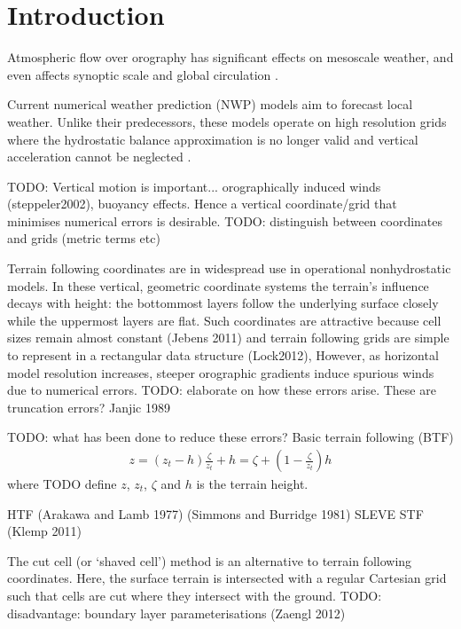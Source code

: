\chapter{Introduction}


Atmospheric flow over orography has significant effects on mesoscale weather, and even affects synoptic scale and global circulation \autocite{good2013}.

Current numerical weather prediction (NWP) models aim to forecast local weather.  Unlike their predecessors, these models operate on high resolution grids where the hydrostatic balance approximation is no longer valid and vertical acceleration cannot be neglected \autocite{steppeler2003}.

TODO: Vertical motion is important... orographically induced winds (steppeler2002), buoyancy effects.  Hence a vertical coordinate/grid that minimises numerical errors is desirable. TODO: distinguish between coordinates and grids (metric terms etc)

Terrain following coordinates are in widespread use in operational nonhydrostatic models.  In these vertical, geometric coordinate systems the terrain's influence decays with height: the bottommost layers follow the underlying surface closely while the uppermost layers are flat.  Such coordinates are attractive because cell sizes remain almost constant (Jebens 2011) and terrain following grids are simple to represent in a rectangular data structure (Lock2012),  However, as horizontal model resolution increases, steeper orographic gradients induce spurious winds due to numerical errors. \autocite{TODO}  TODO: elaborate on how these errors arise.  These are truncation errors?  Janjic 1989

TODO: what has been done to reduce these errors?
Basic terrain following (BTF) \autocite{galchen1975} 
\begin{align}
z = \left( z_t - h \right) \frac{\zeta}{z_t} + h = \zeta + \left( 1 - \frac{\zeta}{z_t} \right) h
\end{align}
where TODO define $z$, $z_t$, $\zeta$ and $h$ is the terrain height.

HTF (Arakawa and Lamb 1977) (Simmons and Burridge 1981)
SLEVE
STF (Klemp 2011)

The cut cell (or `shaved cell')  method is an alternative to terrain following coordinates.  Here, the surface terrain is intersected with a regular Cartesian grid such that cells are cut where they intersect with the ground.  TODO: disadvantage: boundary layer parameterisations (Zaengl 2012)

